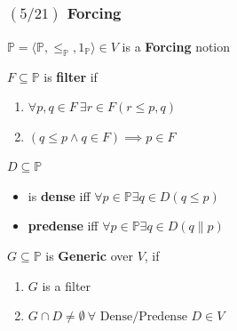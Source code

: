 \documentclass{beamer}
\newcommand{\p}{\mathds{P}}
\begin{document}
\begin{frame}
\frametitle{$(5/21)$ \hspace{20mm} Forcing}
\begin{center}
{\large $\p=\langle \p, \leq_{\p}, 1_{\p}\rangle\in V$ is a \textbf{Forcing} notion}
\end{center}
\vspace{-2mm}
\pause
\begin{definition}
$F \subseteq \p$ is \textbf{filter} if
\begin{enumerate}
\item $\forall p, q \in F \ \exists r \in F (r \leq p, q)$
\item $(q \leq p \land q \in F) \implies p \in F$
\end{enumerate}
\end{definition}
\pause
\begin{definition}
$D \subseteq \p$ 
\begin{itemize}
\item is \textbf{dense} iff \hspace{10mm} $\forall p \in \p \exists q \in D (q \leq p)$
\item \textbf{predense} iff \hspace{8.5mm} $\forall p \in \p \exists q \in D (q \parallel p)$
\end{itemize}
\end{definition}
\pause
\begin{definition}
$G \subseteq \p$ is \textbf{Generic} over $V$, if
\begin{enumerate}
\item $G$ is a filter
\item  $G \cap D \neq \emptyset \ \forall \text{ Dense/Predense } D\in V$
\end{enumerate}
\end{definition}
\end{frame}
\end{document}
